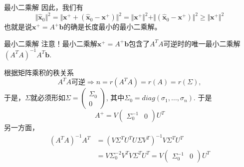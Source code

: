 
\begin{frame}

\begin{block}{最小二乘解}
因此，我们有
$$\Vert \widehat{\mathbf{x}}_0 \Vert^2 = \Vert \mathbf{x}^+ + (\widehat{\mathbf{x}}_0 - \mathbf{x}^+) \Vert^2 = \Vert \mathbf{x}^+ \Vert^2 + \Vert (\widehat{\mathbf{x}}_0 - \mathbf{x}^+) \Vert^2 \geqslant \Vert \mathbf{x}^+ \Vert^2$$
也就是说$\mathbf{x}^+ = A^+\mathbf{b}$的确是长度最小的最小二乘解。
\end{block}

\end{frame}


\begin{frame}

\begin{block}{最小二乘解}
{\color{red}注意}！最小二乘解$\mathbf{x}^+ = A^+\mathbf{b}$包含了$A^TA$可逆时的唯一最小二乘解$(A^TA)^{-1}A^T\mathbf{b}$.

\vspace{1em}
\pause

根据矩阵乘积的秩关系
$$A^TA\text{可逆} \Longrightarrow n = r(A^TA) = r(A) = r(\Sigma),$$
于是，$\Sigma$就必须形如$\Sigma = \begin{pmatrix} \Sigma_0 \\ 0 \end{pmatrix}$, 其中$\Sigma_0 = diag(\sigma_1, \ldots, \sigma_n)$. 于是
$$A^+ = V\begin{pmatrix} \Sigma_0^{-1} & 0 \end{pmatrix} U^T$$
另一方面，
\begin{align*}
(A^TA)^{-1}A^T & = (V\Sigma^TU^TU\Sigma V^T)^{-1} V\Sigma^TU^T \\
& = V \Sigma_0^{-2} V^T V\Sigma^TU^T = V\begin{pmatrix} \Sigma_0^{-1} & 0 \end{pmatrix} U^T
\end{align*}
\end{block}

\end{frame}



